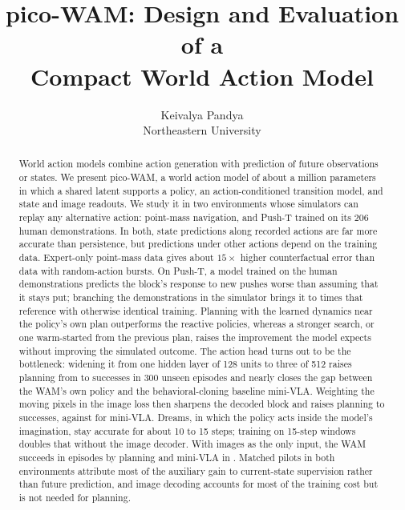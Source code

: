 \documentclass[11pt]{article}
\title{pico-WAM: Design and Evaluation of a\\Compact World Action Model}
\author{Keivalya Pandya\\Northeastern University}
\date{}
\begin{document}
\maketitle

\begin{abstract}
World action models combine action generation with prediction of future observations or states. We present pico-WAM, a world action model of about a million parameters in which a shared latent supports a policy, an action-conditioned transition model, and state and image readouts. We study it in two environments whose simulators can replay any alternative action: point-mass navigation, and Push-T trained on its 206 human demonstrations. In both, state predictions along recorded actions are far more accurate than persistence, but predictions under other actions depend on the training data. Expert-only point-mass data gives about $15\times$ higher counterfactual error than data with random-action bursts. On Push-T, a model trained on the human demonstrations predicts the block's response to new pushes worse than assuming that it stays put; branching the demonstrations in the simulator brings it to \PTchunkBranchCfBlockRatio{} times that reference with otherwise identical training. Planning with the learned dynamics near the policy's own plan outperforms the reactive policies, whereas a stronger search, or one warm-started from the previous plan, raises the improvement the model expects without improving the simulated outcome. The action head turns out to be the bottleneck: widening it from one hidden layer of 128 units to three of 512 raises planning from \PTbranchRestartEpochsPlanSucc{} to \PTheadBasePlanSucc{} successes in 300 unseen episodes and nearly closes the gap between the WAM's own policy and the behavioral-cloning baseline mini-VLA. Weighting the moving pixels in the image loss then sharpens the decoded block and raises planning to \PTfinalPlanSucc{} successes, against \PTfinalVlaSucc{} for mini-VLA. Dreams, in which the policy acts inside the model's imagination, stay accurate for about 10 to 15 steps; training on 15-step windows doubles that without the image decoder. With images as the only input, the WAM succeeds in \PTheadPixPlanSucc{} episodes by planning and mini-VLA in \PTheadPixVlaSucc. Matched pilots in both environments attribute most of the auxiliary gain to current-state supervision rather than future prediction, and image decoding accounts for most of the training cost but is not needed for planning.

\end{abstract}
\end{document}
